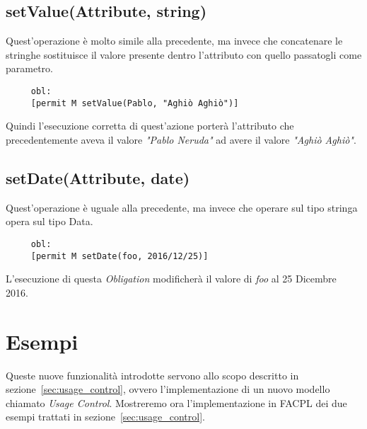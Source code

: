 \subsection*{setValue(Attribute, string)}
\label{ssub:opsetvalue}

Quest'operazione è molto simile alla precedente, ma invece che concatenare le stringhe sostituisce il valore presente dentro l'attributo con quello passatogli come parametro.
\begin{verbatim}
	 obl:
     [permit M setValue(Pablo, "Aghiò Aghiò")]
\end{verbatim}
Quindi l'esecuzione corretta di quest'azione porterà l'attributo che precedentemente aveva il valore 
\textit{"Pablo Neruda"} ad avere il valore \textit{"Aghiò Aghiò"}.


\subsection*{setDate(Attribute, date)}
\label{ssub:opsetvalue}

Quest'operazione è uguale alla precedente, ma invece che operare sul tipo stringa opera sul tipo Data.
\begin{verbatim}
	 obl:
     [permit M setDate(foo, 2016/12/25)]
\end{verbatim}
L'esecuzione di questa \textit{Obligation} modificherà il valore di \textit{foo} al 25 Dicembre 2016.


\section{Esempi} %
\label{sec:esempi}

Queste nuove funzionalità introdotte servono allo scopo descritto in sezione~\ref{sec:usage_control}, ovvero l'implementazione di un nuovo modello chiamato \textit{Usage Control}.
Mostreremo ora l'implementazione in FACPL dei due esempi trattati in sezione~\ref{sec:usage_control}. 
